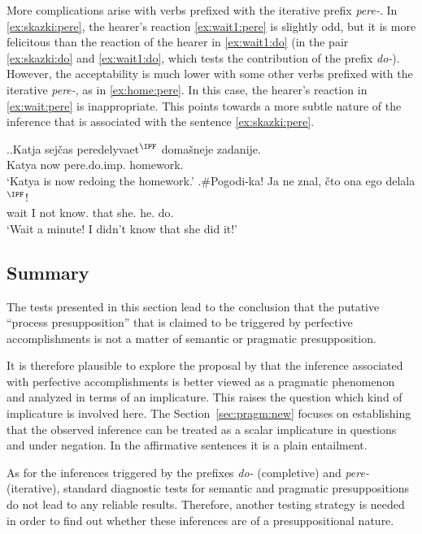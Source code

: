 More complications arise with verbs prefixed with the iterative prefix \textit{pere-}. In \ref{ex:skazki:pere}, the hearer's reaction \ref{ex:wait1:pere} is slightly odd, but it is more felicitous than the reaction of the hearer in \ref{ex:wait1:do} (in the pair \ref{ex:skazki:do} and \ref{ex:wait1:do}, which tests the contribution of the prefix \textit{do-}). However, the acceptability is much lower with some other verbs prefixed with the iterative \textit{pere-}, as in \ref{ex:home:pere}. In this case, the hearer's reaction in \ref{ex:wait:pere} is inappropriate. This points towards a more subtle nature of the inference that is associated with the sentence \ref{ex:skazki:pere}.

\ex.\ag.\label{ex:home:pere}Katja sej\v{c}as peredelyvaet$^{\IPF}$ {doma\v{s}neje zadanije}.\\
Katya now pere.do.imp. homework.\\
\trans `Katya is now redoing the homework.'
\bg.\#Pogodi-ka! Ja ne znal, \v{c}to ona ego delala$^{\IPF}$!\label{ex:wait:pere}\\
wait I not know. that she. he. do.\\
\trans `Wait a minute! I didn't know that she did it!'

\subsection{Summary}
The tests presented in this section lead to the conclusion that the putative ``process presupposition'' that is claimed to be triggered by perfective accomplishments is not a matter of semantic or pragmatic presupposition.

It is therefore plausible to explore the proposal by \citet{Gronn:04, Gronn:06} that the inference associated with perfective accomplishments is better viewed as a pragmatic phenomenon and analyzed in terms of an implicature.
This raises the question which kind of implicature is involved here. The Section~\ref{sec:pragm:new} focuses on establishing that the observed inference can be treated as a scalar implicature in questions and under negation. In the affirmative sentences it is a plain entailment.

As for the inferences triggered by the prefixes \textit{do-} (completive) and \textit{pere-} (iterative), standard diagnostic tests for semantic and pragmatic presuppositions do not lead to any reliable results. Therefore, another testing strategy is needed in order to find out whether these inferences are of a presuppositional nature. 

